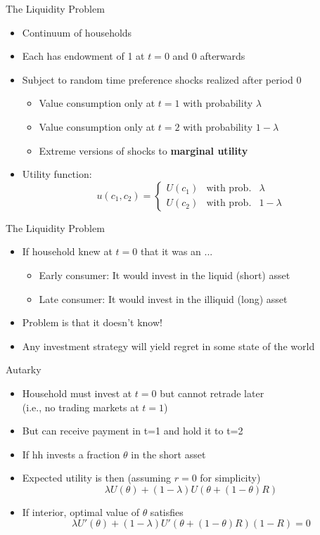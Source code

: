 \documentclass[11pt,aspectratio=169,xcolor={dvipsnames},hyperref={pdftex,pdfpagemode=UseNone,hidelinks,pdfdisplaydoctitle=true},usepdftitle=false]{beamer}
\begin{document}
\begin{frame}{The Liquidity Problem}
\begin{itemize}
	\itemsep1em 
	\item Continuum of households
	\item Each has endowment of 1 at $t=0$ and 0 afterwards
	\item Subject to random time preference shocks realized after period 0
	\begin{itemize}
		\item Value consumption only at $t=1$ with probability $\lambda$
		\item Value consumption only at $t=2$ with probability $1-\lambda$
		\item Extreme versions of shocks to \textbf{marginal utility}
	\end{itemize}
	\item Utility function:
	\[ u(c_1,c_2) = \left\{ \begin{array}{lll}
	U(c_1) & \text{with prob.} & \lambda \\
	U(c_2) & \text{with prob.} & 1-\lambda 
	\end{array} \right. \] 
\end{itemize}
\end{frame}


\begin{frame}{The Liquidity Problem}
\begin{itemize}
	\itemsep1em 
	\item If household knew at $t=0$ that it was an ...
	\begin{itemize}
		\item Early consumer: It would invest in the liquid (short) asset
		\item Late consumer: It would invest in the illiquid (long) asset  
	\end{itemize}
	\item Problem is that it doesn't know!
	\item Any investment strategy will yield regret in some state of the world
\end{itemize}
\end{frame}


\begin{frame}{Autarky}
\begin{itemize}
	\itemsep1em 
	\item Household must invest at $t=0$ but cannot retrade later \\ (i.e., no trading markets at $t=1$)
	\item But can receive payment in t=1 and hold it to t=2
	\item If hh invests a fraction $\theta$ in the short asset
	\item Expected utility is then (assuming $r=0$ for simplicity)
	\[ \lambda U(\theta) + (1-\lambda)U(\theta + (1-\theta)R) \]
	\item If interior, optimal value of $\theta$ satisfies
	\[\lambda U'(\theta) + (1-\lambda) U'(\theta + (1-\theta)R)(1-R) = 0 \] 
\end{itemize}
\end{frame}
\end{document}
